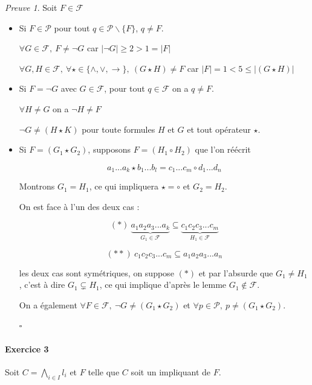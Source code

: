 \documentclass[]{article}
\theoremstyle{remark}
\newtheorem{myproof}{Preuve}
\theoremstyle{definition}
\newcommand{\cqfd}{
	\hfill$\square$
}
\begin{document}
\begin{myproof}
	Soit $F \in \mathcal{F}$
	
	\begin{itemize}
		\item Si $F \in \mathcal{P}$ pour tout $q \in \mathcal{P} \backslash \{F\}$, $q \neq F$.
		
		$\forall G \in \mathcal{F}, ~ F \neq \neg G$ car $|\neg G| \geqslant 2 > 1 = |F|$
		
		$\forall G, H \in \mathcal{F}, ~ \forall \star \in \{\land, \lor, \longrightarrow\}, ~ (G \star H) \neq F$ car $|F| = 1 < 5 \leqslant |(G \star H)|$
		
		\item Si $F=\neg G$ avec $G \in \mathcal{F}$, pour tout $q \in \mathcal{F}$ on a $q \neq F$.
		
		$\forall H \neq G$ on a $\neg H \neq F$
		
		$\neg G \neq (H \star K)$ pour toute formules $H$ et $G$ et tout opérateur $\star$.
		
		\item Si $F=(G_1 \star G_2)$, supposons $F=(H_1 \circ H_2)$ que l'on réécrit
		
		$$a_1...a_k \star b_1...b_l = c_1...c_m \circ d_1...d_n$$
		
		Montrons $G_1 = H_1$, ce qui impliquera $\star = \circ$ et $G_2 = H_2$.
		
		On est face à l'un des deux cas :
		
		$$(*) ~ \underbrace{a_1 a_2 a_3 ...a_k}_{G_1 \in \mathcal{F}} \subseteq \underbrace{c_1 c_2 c_3 ...c_m}_{H_1 \in \mathcal{F}}$$
		
		$$(**) ~ c_1 c_2 c_3 ...c_m\subseteq a_1 a_2 a_3 ...a_n$$
		
		les deux cas sont symétriques, on suppose $(*)$ et par l'absurde que $G_1 \neq H_1$, c'est à dire $G_1 \subsetneq H_1$, ce qui implique d'après le lemme $G_1 \notin \mathcal{F}$.
		
		On a également $\forall F \in \mathcal{F}, ~ \neg G \neq (G_1 \star G_2)$ et $\forall p \in \mathcal{P}, ~ p \neq (G_1 \star G_2)$.
		
		\cqfd
	\end{itemize}
\end{myproof}

\paragraph{Exercice 3}

Soit $C = \bigwedge_{i \in I} l_i$ et $F$ telle que $C$ soit un impliquant de $F$.
\end{document}
